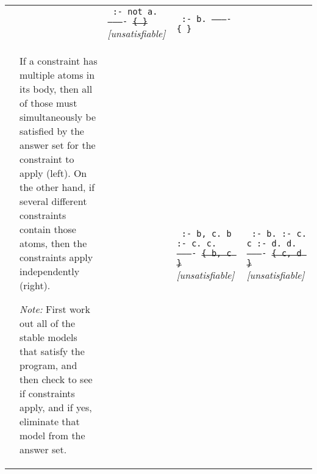 \documentclass[10pt,a4paper,landscape]{article}
\begin{document}
\begin{longtable}{p{3cm}p{14cm}lp{3.5cm}p{3.5cm}}
		&& \texttt{%
			:- not a. \newline
			---------- \newline
			\sout{\{ \}}} \newline		
			\textit{[unsatisfiable]}
		& \texttt{%
			:- b. \newline
			---------- \newline
			\{ \} } \\
			
		& If a constraint has multiple atoms in its body, then all of those must simultaneously be satisfied by the answer set for the constraint to apply (left).
		On the other hand, if several different constraints contain those atoms, then the constraints apply independently (right). \newline
		
		\textit{Note:} First work out all of the stable models that satisfy the program, and then check to see if constraints apply, and if yes, eliminate that model from the answer set.
		&& \texttt{%
			:- b, c. \newline
			b :- c. \newline
			c. \newline
			---------- \newline
			\sout{\{ b, c \}} } \newline
			\textit{[unsatisfiable]}
		& \texttt{%
			:- b. \newline
			:- c. \newline
			c :- d. \newline
			d. \newline
			---------- \newline
			\sout{\{ c, d \}} } \newline
		\textit{[unsatisfiable]} \\ \midrule
		

\end{longtable}
\end{document}
